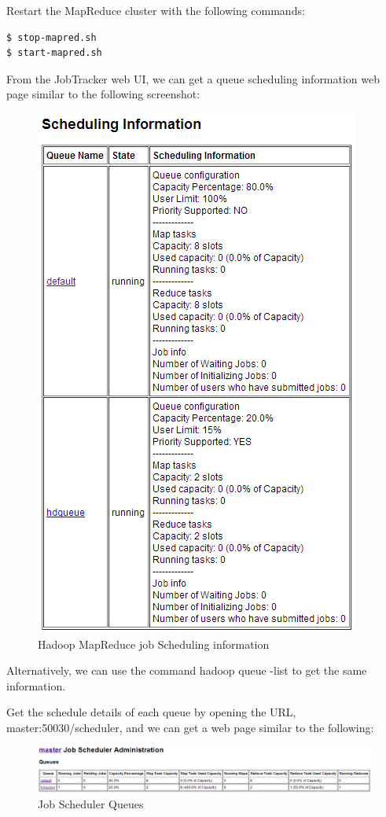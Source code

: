 Restart the MapReduce cluster with the following commands:
\lstset{style=bashstyle}
\begin{lstlisting}
$ stop-mapred.sh
$ start-mapred.sh
\end{lstlisting}

From the JobTracker web UI, we can get a queue scheduling information web page similar to the following screenshot: \\
\begin{figure}[h]
  \centering
  \includegraphics[width=.65\textwidth]{figs/5163os_04_17.png}
  \caption{Hadoop MapReduce job Scheduling information}\label{fig:mapred.scheduling}
\end{figure} 

Alternatively, we can use the command hadoop queue -list to get the same information. 

Get the schedule details of each queue by opening the URL, master:50030/scheduler, and we can get a web page similar to the following: 
\begin{figure}[h]
  \centering
  \includegraphics[width=\textwidth]{figs/5163os_04_18.png}
  \caption{Job Scheduler Queues}\label{fig:job.queues}
\end{figure} 

